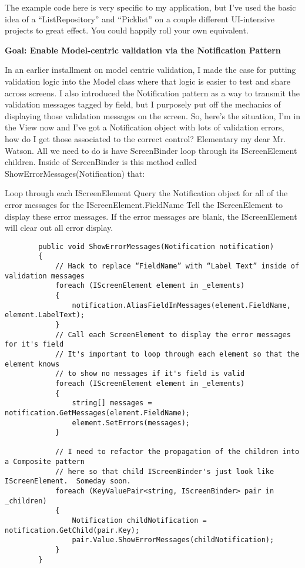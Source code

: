 \documentclass{article}
\begin{document}
{The example code here is very specific to my application, but I've used the basic idea of a “ListRepository” and “Picklist” on a couple different UI-intensive projects to great effect.  You could happily roll your own equivalent.

\Large {\textbf{Goal:  Enable Model-centric validation via the Notification Pattern}}

In an earlier installment on model centric validation, I made the case for putting validation logic into the Model class where that logic is easier to test and share across screens.  I also introduced the Notification pattern as a way to transmit the validation messages tagged by field, but I purposely put off the mechanics of displaying those validation messages on the screen.  So, here's the situation, I'm in the View now and I've got a Notification object with lots of validation errors, how do I get those associated to the correct control?  Elementary my dear Mr. Watson.  All we need to do is have ScreenBinder loop through its IScreenElement children.  Inside of ScreenBinder is this method called ShowErrorMessages(Notification) that: 


    Loop through each IScreenElement
    Query the Notification object for all of the error messages for the IScreenElement.FieldName
    Tell the IScreenElement to display these error messages.  If the error messages are blank, the IScreenElement will clear out all error display.
	
\begin{lstlisting}
        public void ShowErrorMessages(Notification notification)
        {
            // Hack to replace “FieldName” with “Label Text” inside of validation messages
            foreach (IScreenElement element in _elements)
            {
     			notification.AliasFieldInMessages(element.FieldName, element.LabelText);
            }
            // Call each ScreenElement to display the error messages for it's field
            // It's important to loop through each element so that the element knows
            // to show no messages if it's field is valid
            foreach (IScreenElement element in _elements)
            {
                string[] messages = notification.GetMessages(element.FieldName);
                element.SetErrors(messages);
            }

            // I need to refactor the propagation of the children into a Composite pattern
            // here so that child IScreenBinder's just look like IScreenElement.  Someday soon.
            foreach (KeyValuePair<string, IScreenBinder> pair in _children)
            {
                Notification childNotification = notification.GetChild(pair.Key);
                pair.Value.ShowErrorMessages(childNotification);
            }
        }
\end{lstlisting}

}
\end{document}

